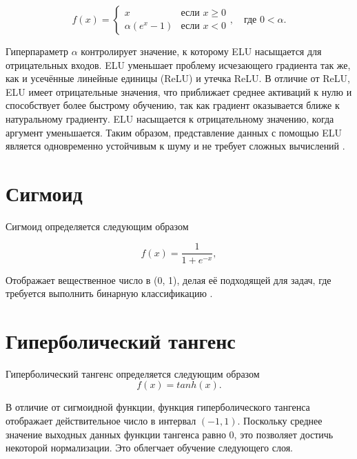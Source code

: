 	\begin{equation}
		f(x) = 
		\begin{cases} 
			x & \text{если } x \geq 0 \\
			\alpha (e^x - 1) & \text{если } x < 0
		\end{cases}, \quad \text{где } 0 < \alpha.
	\end{equation}
	
	Гиперпараметр \(\alpha\) контролирует значение, к которому ELU насыщается для отрицательных входов. ELU уменьшает проблему исчезающего градиента так же, как и усечённые линейные единицы (ReLU) и утечка ReLU. В отличие от ReLU, ELU имеет отрицательные значения, что приближает среднее активаций к нулю и способствует более быстрому обучению, так как градиент оказывается ближе к натуральному градиенту. ELU насыщается к отрицательному значению, когда аргумент уменьшается. Таким образом, представление данных с помощью ELU является одновременно устойчивым к шуму и не требует сложных вычислений \cite{survey, caltech101}.
	
	\newpage
	
	
	
\section {Сигмоид}
	Сигмоид определяется следующим образом

	\begin{equation}
		f(x) = \frac{1}{1 + e^{-x}},
	\end{equation}
	
	Отображает вещественное число в (0, 1), делая её подходящей для задач, где требуется выполнить бинарную классификацию \cite{3dimension}.
	
	
\section {Гиперболический тангенс}
	Гиперболический тангенс определяется следующим образом
	\begin{equation}
		f(x) = tanh(x).
	\end{equation}
	
	В отличие от сигмоидной функции, функция гиперболического тангенса отображает действительное число в интервал \((-1, 1)\). Поскольку среднее значение выходных данных функции тангенса равно 0, это позволяет достичь некоторой нормализации. Это облегчает обучение следующего слоя.
	
